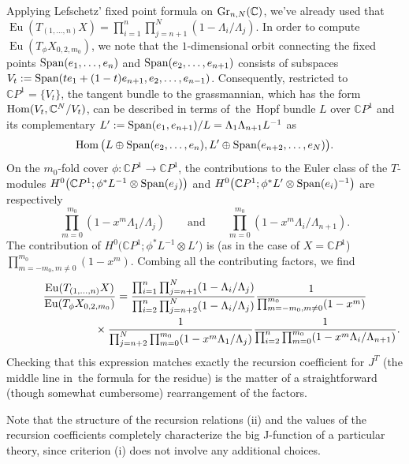 \documentclass[pdftex]{sigma}
\numberwithin{equation}{section}
\def\CC{\mathbb C}
\def\Eu{\operatorname{Eu}}
\begin{document}
Applying Lefschetz' fixed point formula on ${\rm Gr}_{n,N}(\CC)$, we've already used that $\Eu(T_{(1,\dots,n)}X)\!=\prod_{i=1}^n\prod_{j=n+1}^N(1-\Lambda_i/\Lambda_j)$. In order to compute $\Eu(T_{\phi}X_{0,2,m_0})$, we note that the $1$-dimensional orbit connecting the fixed points $\mathop{\rm Span} (e_1,\dots,e_n)$ and $\mathop{\rm Span} (e_2,\dots,e_{n+1})$ consists of subspaces $V_t:=\mathop{\rm Span}(t e_1+(1-t) e_{n+1}, e_2,\dots,e_{n-1})$. Consequently, restricted to $\CC P^1=\{ V_t \}$, the tangent bundle to the grassmannian, which has the form $\mathop{\rm Hom} (V_t,\CC^N/V_t)$, can be described in terms of~the~Hopf bundle $L$ over $\CC P^1$ and its complementary $L':=\mathop{\rm Span}(e_1,e_{n+1})/L=\Lambda_1\Lambda_{n+1}L^{-1}$ as
\[
\mathop{\rm Hom} \big(L \oplus \mathop{\rm Span}(e_2,\dots,e_n), L' \oplus \mathop{\rm Span}(e_{n+2},\dots,e_N)\big).
\]
On the $m_0$-fold cover $\phi\colon \CC P^1\to \CC P^1$, the contributions to the Euler class of the $T$-modules $H^0\big(\CC P^1; \phi^*L^{-1}\otimes \mathop{\rm Span} (e_j)\big)$ and $H^0\big(\CC P^1; \phi^*L'\otimes \mathop{\rm Span}(e_i)^{-1}\big)$ are respectively
\[
\prod_{m=0}^{m_0}(1-x^m\Lambda_1/\Lambda_j)\qquad \text{and}\qquad \prod_{m=0}^{m_0}(1-x^m\Lambda_i/\Lambda_{n+1}).
\]
The contribution of $H^0\big(\CC P^1; \phi^*L^{-1}\otimes L'\big)$ is (as in the case of $X=\CC P^1$) $\prod_{m=-m_0, m\neq 0}^{m_0}(1-x^m)$. Combing all the contributing factors, we find
\begin{gather*}
\frac{\Eu(T_{(1,\dots,n)}X)}{\Eu(T_{\phi}X_{0,2,m_0})}=
\frac{\prod_{i=1}^n\prod_{j=n+1}^N(1-\Lambda_i/\Lambda_j)}
{\prod_{i=2}^n\prod_{j=n+2}^N(1-\Lambda_i/\Lambda_j)}
\frac{1}{\prod_{m=-m_0, m\neq 0}^{m_0}(1-x^m)}
\\ \hphantom{\frac{\Eu(T_{(1,\dots,n)}X)}{\Eu(T_{\phi}X_{0,2,m_0})}=}
{}\times \frac{1}{\prod_{j=n+2}^N\prod_{m=0}^{m_0}(1-x^m\Lambda_1/\Lambda_j)}
\frac{1}{\prod_{i=2}^n\prod_{m=0}^{m_0}(1-x^m\Lambda_i/\Lambda_{n+1})}.
\end{gather*}
Checking that this expression matches exactly the recursion coefficient for $J^T$ (the middle line in~the formula for the residue) is the matter of a straightforward (though somewhat cumbersome) rearrangement of the factors.

\begin{Remark}\label{rmk3}
Note that the structure of the recursion relations (ii) and the values of the recursion coefficients completely characterize the big J-function of a particular theory, since criterion (i) does not involve any additional choices.
\end{Remark}
\end{document}
